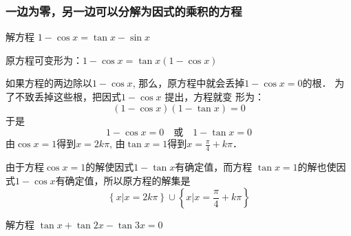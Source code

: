 \subsubsection{一边为零，另一边可以分解为因式的乘积的方程}
\begin{example}
    解方程
$1-\cos x =\tan x-\sin x$
\end{example}

\begin{solution}
    原方程可变形为：$1-\cos x =\tan x(1-\cos x)$

    如果方程的两边除以$1-\cos x$, 那么，原方程中就会丢掉$1-\cos x=0$的根．
为了不致丢掉这些根，把因式$1-\cos x$
提出，方程就变
形为：
\[(1-\cos x)(1-\tan x)=0\]
于是
$$1-\cos x=0\quad  \text{或}\quad 1-\tan x=0$$
由$\cos x=1$得到$x=2k\pi$, 由$\tan x=1$得到$x=\frac{\pi}{4}+k\pi$．

由于方程$\cos x=1$的解使因式$1-\tan x$有确定值，而方程
$\tan x=1$的解也使因式$1-\cos x$有确定值，所以原方程的解集是
\[\left\{x\big|x=2k\pi\right\}\cup \left\{x\big|x=\frac{\pi}{4}+k\pi\right\}\]
\end{solution}


\begin{example}
    解方程 $\tan x+\tan 2x-\tan 3x=0$
\end{example}

